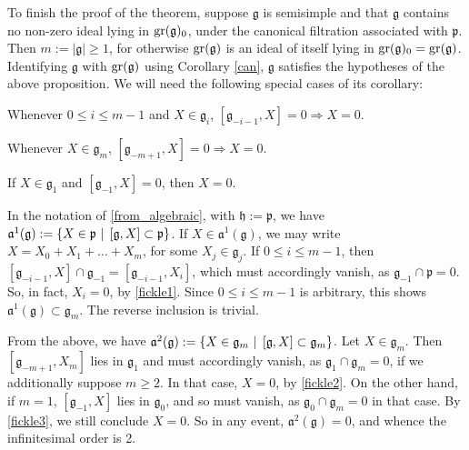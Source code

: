 \documentclass[leqno,12pt]{amsart} %
\begin{document}
To finish the proof of the theorem, suppose ${\mathfrak g} $ is semisimple and that
${\mathfrak g}$ contains no non-zero ideal lying in $\operatorname{\operatorname{gr}}({\mathfrak g})_0$, under the
canonical filtration associated with ${\mathfrak p}$. Then $m:=|{\mathfrak g}|\ge 1$, for
otherwise $\operatorname{\operatorname{gr}}({\mathfrak g})$ is an ideal of itself lying in
$\operatorname{\operatorname{gr}}({\mathfrak g})_0=\operatorname{\operatorname{gr}}({\mathfrak g})$. Identifying ${\mathfrak g} $ with
$\operatorname{\operatorname{gr}}({\mathfrak g})$ using Corollary \ref{can}, ${\mathfrak g} $ satisfies the
hypotheses of the above proposition. We will need the following special cases of its
corollary:
\begin{conditions}
\item\label{fickle1} Whenever $0 \le i \le m - 1$ and $X \in {\mathfrak g}_i$,
  $[{\mathfrak g}_{-i-1}, X]=0 \Rightarrow X =0$.
\item\label{fickle2} Whenever
  $X \in {\mathfrak g}_m$, $[{\mathfrak g}_{-m+1}, X] =0 \Rightarrow X =0$.
\item\label{fickle3} If $X \in {\mathfrak g}_1$ and $[{\mathfrak g}_{-1}, X]=0$, then
  $X=0$.
\end{conditions}

In the notation of \ref{from_algebraic}, with ${\mathfrak h}:= {\mathfrak p}$, we have
${\mathfrak a}^1({\mathfrak g}):=\{X \in {\mathfrak p}\,\left\vert\right.\, [{\mathfrak g},X] \subset
{\mathfrak p} \}$. If $X \in {\mathfrak a}^1({\mathfrak g})$, we may write
$X = X_0 + X_1 + \ldots + X_m$, for some $X_j \in {\mathfrak g}_j$. If
$0 \le i \le m - 1$, then
$[{\mathfrak g}_{-i-1}, X] \cap {\mathfrak g}_{-1} = [{\mathfrak g}_{-i-1}, X_i]$, which
must accordingly vanish, as ${\mathfrak g}_{-1}\cap {\mathfrak p} =0$. So, in fact,
$X_i=0$, by \eqref{fickle1}. Since $0 \le i \le m - 1$ is arbitrary, this shows
${\mathfrak a}^1({\mathfrak g}) \subset {\mathfrak g}_m$. The reverse inclusion is
trivial.

From the above, we have
${\mathfrak a}^2({\mathfrak g}):=\{X \in {\mathfrak g}_m\,\left\vert\right.\, [{\mathfrak g},X]
\subset {\mathfrak g}_m \}$. Let $X \in {\mathfrak g}_m$. Then
$[{\mathfrak g}_{-m +1}, X_m]$ lies in ${\mathfrak g}_1$ and must accordingly vanish, as
${\mathfrak g}_1\cap {\mathfrak g}_m=0$, if we additionally suppose $m \ge 2$. In that
case, $X=0$, by \eqref{fickle2}. On the other hand, if $m=1$, $[{\mathfrak g}_{-1}, X]$
lies in ${\mathfrak g}_0$, and so must vanish, as
${\mathfrak g}_0 \cap {\mathfrak g}_m = 0$ in that case. By \eqref{fickle3}, we still
conclude $X=0$. So in any event, ${\mathfrak a}^2({\mathfrak g})=0$, and whence the
infinitesimal order is 2.
\end{document}
